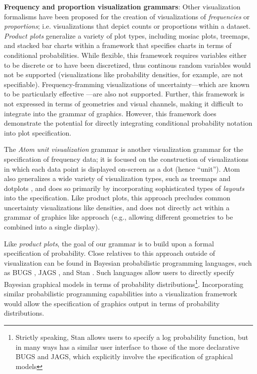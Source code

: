 \documentclass[11pt]{article}
\begin{document}
\noindent \textbf{Frequency and proportion visualization grammars}: Other visualization formalisms have been proposed for the creation of visualizations of \emph{frequencies} or \emph{proportions}; i.e. visualizations that depict counts or proportions within a dataset. \emph{Product plots} \cite{wickham_product_2011} generalize a variety of plot types, including mosiac plots, treemaps, and stacked bar charts within a framework that specifies charts in terms of conditional probabilities. While flexible, this framework requires variables either to be discrete or to have been discretized, thus continous random variables would not be supported (visualizations like probability densities, for example, are not specifiable). Frequency-framming visualizations of uncertainty---which are known to be particularly effective \cite{Fernandes2018, kay2016bus, Ancker2006, hullman2015hypothetical, kale2018hypothetical, padilla2017effects, Padilla2015}---are also not supported. Further, this framework is not expressed in terms of geometries and visual channels, making it difficult to integrate into the grammar of graphics. However, this framework does demonstrate the potential for directly integrating conditional probability notation into plot specification.

The \emph{Atom} \emph{unit visualization} grammar \cite{Park2017} is another visualization grammar for the specification of frequency data; it is focused on the construction of visualizations in which each data point is displayed on-screen as a dot (hence ``unit''). Atom also generalizes a wide variety of visualization types, such as treemaps \cite{johnson1991tree} and dotplots \cite{Wilkinson1999dotplots}, and does so primarily by incorporating sophisticated types of \emph{layouts} into the specification. Like product plots, this approach precludes common uncertainty visualizations like densities, and does not directly act within a grammar of graphics like approach (e.g., allowing different geometries to be combined into a single display). 

Like \emph{product plots}, the goal of our grammar is to build upon a formal specification of probability. Close relatives to this approach outside of visualization can be found in Bayesian probabilistic programming languages, such as BUGS \cite{lunn2009bugs, lunn2000winbugs}, JAGS \cite{plummer2003jags}, and Stan \cite{carpenter2017stan}. Such languages allow users to directly specify Bayesian graphical models in terms of probability distributions\footnote{Strictly speaking, Stan allows users to specify a log probability function, but in many ways has a similar user interface to those of the more declarative BUGS and JAGS, which explicitly involve the specification of graphical models}. Incorporating similar probabilistic programming capabilities into a visualization framework would allow the specification of graphics output in terms of probability distributions.
\end{document}
